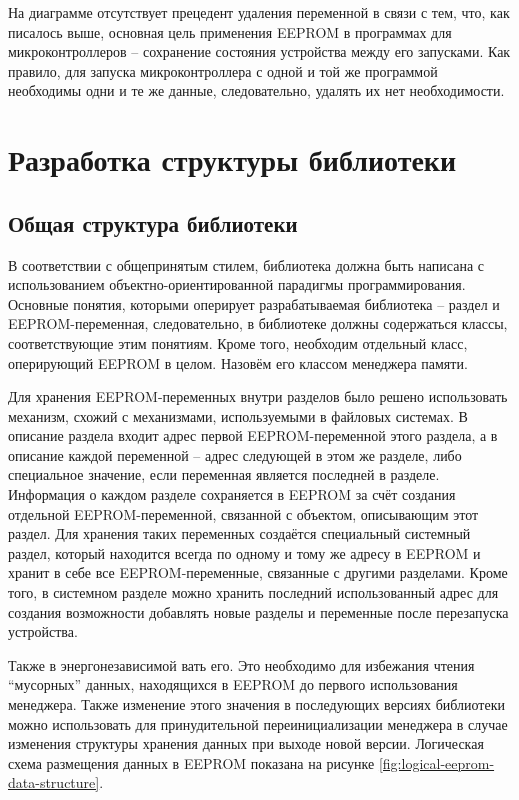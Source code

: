 На диаграмме отсутствует прецедент удаления переменной в связи с тем, что, как писалось выше, основная цель применения EEPROM в программах для  микроконтроллеров -- сохранение состояния устройства между его запусками.
Как правило, для запуска микроконтроллера с одной и той же программой необходимы одни и те же данные, следовательно, удалять их нет необходимости.

\section{Разработка структуры библиотеки}

\subsection{Общая структура библиотеки} \label{subsection:library-structure}

В соответствии с общепринятым стилем, библиотека должна быть написана с использованием объектно-ориентированной парадигмы программирования.
Основные понятия, которыми оперирует разрабатываемая библиотека -- раздел и EEPROM-переменная, следовательно, в библиотеке должны содержаться классы, соответствующие этим понятиям.
Кроме того, необходим отдельный класс, оперирующий EEPROM в целом. Назовём его классом менеджера памяти.

Для хранения EEPROM-переменных внутри разделов было решено использовать механизм, схожий с механизмами, используемыми в файловых системах.
В описание раздела входит адрес первой EEPROM-переменной этого раздела, а в описание каждой переменной -- адрес следующей в этом же разделе, либо специальное значение, если переменная является последней в разделе.
Информация о каждом разделе сохраняется в EEPROM за счёт создания отдельной EEPROM-переменной, связанной с объектом, описывающим этот раздел.
Для хранения таких переменных создаётся специальный системный раздел, который находится всегда по одному и тому же адресу в EEPROM и хранит в себе все EEPROM-переменные, связанные с другими разделами.
Кроме того, в системном разделе можно хранить последний использованный адрес для создания возможности добавлять новые разделы и переменные после перезапуска устройства.

Также в энергонезависимой  вать его.
Это необходимо для избежания чтения "`мусорных"' данных, находящихся в EEPROM до первого использования менеджера.
Также изменение этого значения в последующих версиях библиотеки можно использовать для принудительной переинициализации менеджера в случае изменения структуры хранения данных при выходе новой версии.
Логическая схема размещения данных в EEPROM показана на рисунке \ref{fig:logical-eeprom-data-structure}.

